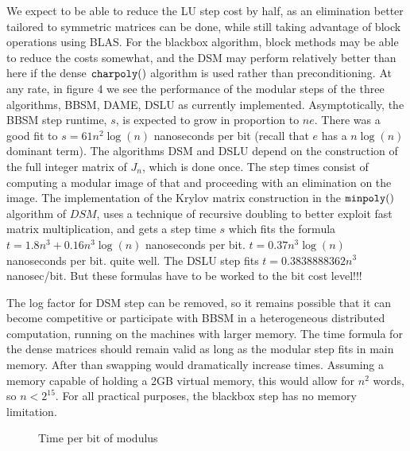 \documentclass{acm_proc_article-sp}
\newcommand{\charpoly}[1]{\ensuremath{\mbox{\tt charpoly}(#1)}}
\newcommand{\minpoly}[1]{\ensuremath{\mbox{\tt minpoly}(#1)}}
\begin{document}
We expect to be able to reduce the LU step cost
by half, as an elimination better tailored to symmetric matrices can be done, while still taking
advantage of block operations using BLAS. For the blackbox algorithm, block methods may 
be able to reduce the costs somewhat, and the DSM may perform relatively better than
here if the dense \charpoly{} algorithm \cite{Pernet03} %
is used rather than preconditioning.
At any rate, in figure 4 we see the performance of the modular steps of the three algorithms,
BBSM, DAME, DSLU as currently implemented.
Asymptotically, the BBSM step runtime, $s$, is expected to grow in
proportion to $ne$. There was a good fit to $s = 61 n^2\log(n)$ nanoseconds per bit
(recall that $e$ has a $n\log(n)$ dominant term).
The algorithms DSM and DSLU depend on the construction of the full integer matrix of 
$J_n$, which is done once.  The step times consist of computing a modular
image of that and proceeding with an elimination on the image.
The implementation of the Krylov matrix construction in the \minpoly{} algorithm of $DSM$,
uses a technique of recursive doubling to better exploit fast matrix multiplication,
and gets a step time $s$ which fits the formula 
$t = 1.8   n^3  + 0.16  n^3 \log(n)$ nanoseconds per bit.
$t = 0.37 n^3 \log(n)$ nanoseconds per bit.
quite well.  
The DSLU step fits 
$t = 0.3838888362 n^3$ nanosec/bit.
But these formulas have to be worked to the bit cost level!!!

The log factor for DSM step can be removed, so it remains possible that it can become 
competitive or participate with BBSM in a heterogeneous distributed computation, running
on the machines with larger memory.  
The time formula for the dense matrices should remain valid as long as the modular
step fits in main memory. After than swapping would dramatically increase times.
Assuming a memory capable of holding a 2GB virtual memory,
this would allow for $n^2$ words, so $n < 2^{15}$.  For all practical purposes,
the blackbox step has no memory limitation.
\begin{figure}[h]
\caption{Time per bit of modulus}
\end{figure}
\end{document}
